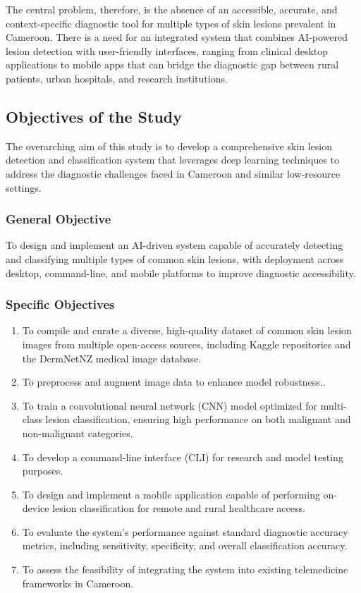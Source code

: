 \documentclass[
  12pt,
  oneside]{article}
\begin{document}
The central problem, therefore, is the absence of an accessible,
accurate, and context-specific diagnostic tool for multiple types of
skin lesions prevalent in Cameroon. There is a need for an integrated
system that combines AI-powered lesion detection with user-friendly
interfaces, ranging from clinical desktop applications to mobile apps
that can bridge the diagnostic gap between rural patients, urban
hospitals, and research institutions.

\subsection{Objectives of the Study}\label{objectives-of-the-study}

The overarching aim of this study is to develop a comprehensive skin
lesion detection and classification system that leverages deep learning
techniques to address the diagnostic challenges faced in Cameroon and
similar low-resource settings.

\subsubsection{General Objective}\label{general-objective}

To design and implement an AI-driven system capable of accurately
detecting and classifying multiple types of common skin lesions, with
deployment across desktop, command-line, and mobile platforms to improve
diagnostic accessibility.

\subsubsection{Specific Objectives}\label{specific-objectives}

\begin{enumerate}
    \item To compile and curate a diverse, high-quality dataset of common skin lesion images from multiple open-access sources, including Kaggle repositories and the DermNetNZ medical image database.
    \item To preprocess and augment image data to enhance model robustness..
    \item To train a convolutional neural network (CNN) model optimized for multi-class lesion classification, ensuring high performance on both malignant and non-malignant categories.
    \item To develop a command-line interface (CLI) for research and model testing purposes.
    \item To design and implement a mobile application capable of performing on-device lesion classification for remote and rural healthcare access.
    \item To evaluate the system's performance against standard diagnostic accuracy metrics, including sensitivity, specificity, and overall classification accuracy.
    \item To assess the feasibility of integrating the system into existing telemedicine frameworks in Cameroon.
\end{enumerate}
\end{document}
